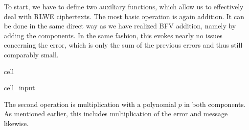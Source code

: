\documentclass[letterpaper,10pt,english]{jupyterBook}
\begin{document}
\label{\detokenize{Thesis:operations-on-rlwe-ciphertexts}}
\begin{DUlineblock}{0em}
\item[] 
\end{DUlineblock}

\sphinxAtStartPar
To start, we have to define two auxiliary functions, which allow us to effectively deal with RLWE ciphertexts.
The most basic operation is again addition.
It can be done in the same direct way as we have realized BFV addition, namely by adding the components.
In the same fashion, this evokes nearly no issues concerning the error, which is only the sum of the previous errors and thus still comparably small.

\begin{sphinxuseclass}{cell}\begin{sphinxVerbatimInput}

\begin{sphinxuseclass}{cell_input}
\begin{sphinxVerbatim}[commandchars=\\\{\}]
   
     \PYG{p}{[}\PYG{p}{[}\PYG{p}{]}\PYG{p}{[}\PYG{p}{]}  \PYG{p}{[}\PYG{p}{]}\PYG{p}{[}\PYG{p}{]} \PYG{p}{]}
\end{sphinxVerbatim}

\end{sphinxuseclass}\end{sphinxVerbatimInput}

\end{sphinxuseclass}
\sphinxAtStartPar
The second operation is multiplication with a polynomial \(p\) in both components.
As mentioned earlier, this includes multiplication of the error and message likewise.
\end{document}
